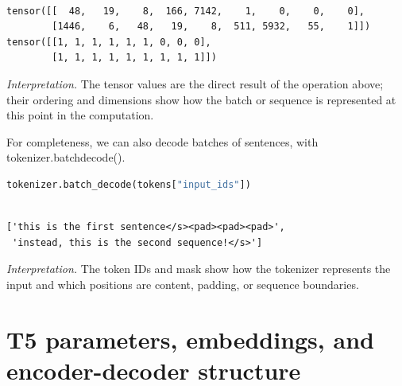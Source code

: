 \documentclass[../labs.tex]{subfiles}
\begin{document}
\begin{lstlisting}[basicstyle=\ttfamily\scriptsize,breaklines=true,breakatwhitespace=false,columns=fullflexible,keepspaces=true]

tensor([[  48,   19,    8,  166, 7142,    1,    0,    0,    0],
        [1446,    6,   48,   19,    8,  511, 5932,   55,    1]])
tensor([[1, 1, 1, 1, 1, 1, 0, 0, 0],
        [1, 1, 1, 1, 1, 1, 1, 1, 1]])

\end{lstlisting}

\noindent\emph{Interpretation.} The tensor values are the direct result of the operation above; their ordering and dimensions show how the batch or sequence is represented at this point in the computation.



\noindent For completeness, we can also decode batches of sentences, with tokenizer.batchdecode().

\begin{lstlisting}[language=Python,basicstyle=\ttfamily\scriptsize,breaklines=true,breakatwhitespace=false,columns=fullflexible,keepspaces=true,numbers=none]
tokenizer.batch_decode(tokens["input_ids"])
\end{lstlisting}

\hypertarget{res:lab02-text-01-t5-ipynb-36-357c4c7fdc03}{}

\begin{lstlisting}[basicstyle=\ttfamily\scriptsize,breaklines=true,breakatwhitespace=false,columns=fullflexible,keepspaces=true]

['this is the first sentence</s><pad><pad><pad>',
 'instead, this is the second sequence!</s>']

\end{lstlisting}

\noindent\emph{Interpretation.} The token IDs and mask show how the tokenizer represents the input and which positions are content, padding, or sequence boundaries.

\section{T5 parameters, embeddings, and encoder-decoder structure}

\end{document}
